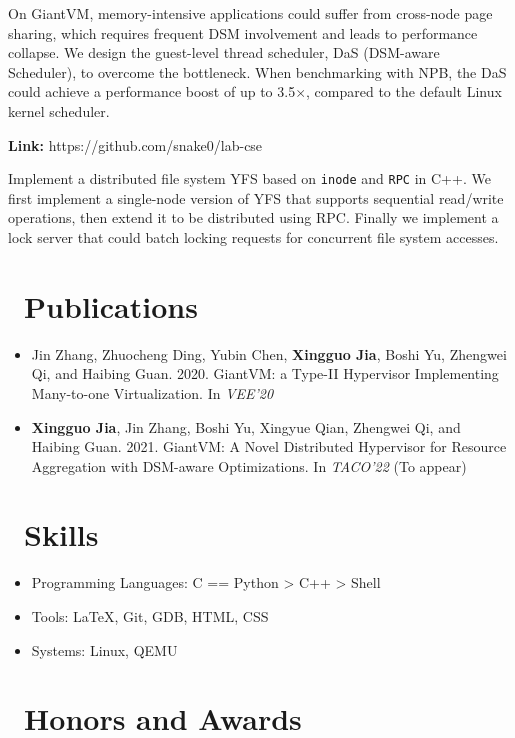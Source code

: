 \documentclass{resume}
\begin{document}
On GiantVM, memory-intensive applications could suffer from cross-node page sharing, which requires frequent DSM involvement and leads to performance collapse. We design the guest-level thread scheduler, DaS (DSM-aware Scheduler), to overcome the bottleneck. When benchmarking with NPB, the DaS could achieve a performance boost of up to 3.5$\times$, compared to the default Linux kernel scheduler. 

\textbf{Link:} https://github.com/snake0/lab-cse

Implement a distributed file system YFS based on \texttt{inode} and \texttt{RPC} in C++. We first implement a single-node version of YFS that supports sequential read/write operations, then extend it to be distributed using RPC. Finally we implement a lock server that could batch locking requests for concurrent file system accesses.

\section{\faGraduationCap\ Publications}
\begin{itemize}
\item Jin Zhang, Zhuocheng Ding, Yubin Chen, \textbf{Xingguo Jia}, Boshi Yu, Zhengwei Qi, and Haibing Guan. 2020. GiantVM: a Type-II Hypervisor Implementing Many-to-one Virtualization. In \textit{VEE'20}
\item \textbf{Xingguo Jia}, Jin Zhang, Boshi Yu, Xingyue Qian, Zhengwei Qi, and Haibing Guan. 2021. GiantVM: A Novel Distributed Hypervisor for Resource Aggregation with DSM-aware Optimizations. In \textit{TACO'22} (To appear)
\end{itemize}

\section{\faCogs\ Skills}
\begin{itemize}[parsep=0.5ex]
  \item Programming Languages: C == Python > C++ > Shell
  \item Tools: \LaTeX, Git, GDB, HTML, CSS
  \item Systems: Linux, QEMU
\end{itemize}

\section{\faHeartO\ Honors and Awards}
\end{document}
